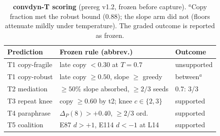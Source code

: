 \documentclass[10pt,a4paper,twocolumn]{article}
\begin{document}
\begin{table}[t]
\small
\centering
\begin{tabularx}{\linewidth}{l X l}
\toprule
\textbf{Prediction} & \textbf{Frozen rule (abbrev.)} & \textbf{Outcome} \\
\midrule
T1 copy-fragile & late copy $<0.30$ at $T{=}0.7$ & unsupported \\
T1 copy-robust  & late copy $\ge 0.50$, slope $\ge$ greedy & between$^{a}$ \\
T2 mediation    & $\ge 50\%$ slope absorbed, $\ge 2/3$ seeds & 0.7: 3/3 \\
T3 repeat knee  & copy $\ge 0.60$ by t2; knee $c\in\{2,3\}$ & supported \\
T4 paraphrase   & $\Delta_P(8) > +0.40$, $\ge 2/3$ ord. & supported \\
T5 coalition    & E87 $d{>}{+}1$, E114 $d{<}{-}1$ at L14 & supported \\
\bottomrule
\end{tabularx}
\caption{\textbf{convdyn-T scoring} (prereg v1.2, frozen before capture).
$^{a}$Copy fraction met the robust bound ($0.88$); the slope arm did not
(floors attenuate mildly under temperature). The graded outcome is reported as
frozen.}
\label{tab:convdynT}
\end{table}
\end{document}
